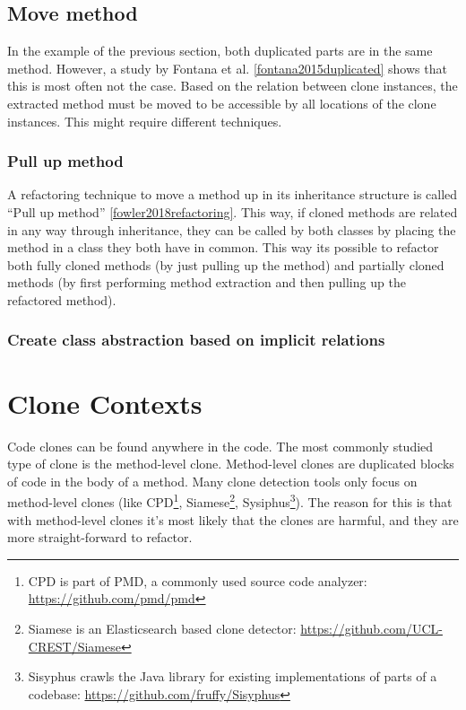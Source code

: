 \subsection{Move method}
In the example of the previous section, both duplicated parts are in the same method. However, a study by Fontana et al. \ref{fontana2015duplicated} shows that this is most often not the case. Based on the relation between clone instances, the extracted method must be moved to be accessible by all locations of the clone instances. This might require different techniques.

\subsubsection{Pull up method}
A refactoring technique to move a method up in its inheritance structure is called ``Pull up method'' \ref{fowler2018refactoring}. This way, if cloned methods are related in any way through inheritance, they can be called by both classes by placing the method in a class they both have in common. This way its possible to refactor both fully cloned methods (by just pulling up the method) and partially cloned methods (by first performing method extraction and then pulling up the refactored method).

\subsubsection{Create class abstraction based on implicit relations}
\todo{}

\section{Clone Contexts} %
Code clones can be found anywhere in the code. The most commonly studied type of clone is the method-level clone. Method-level clones are duplicated blocks of code in the body of a method. Many clone detection tools only focus on method-level clones (like CPD\footnote{CPD is part of PMD, a commonly used source code analyzer: \url{https://github.com/pmd/pmd}}, Siamese\footnote{Siamese is an Elasticsearch based clone detector: \url{https://github.com/UCL-CREST/Siamese}}, Sysiphus\footnote{Sisyphus crawls the Java library for existing implementations of parts of a codebase: \url{https://github.com/fruffy/Sisyphus}}). The reason for this is that with method-level clones it's most likely that the clones are harmful, and they are more straight-forward to refactor.

